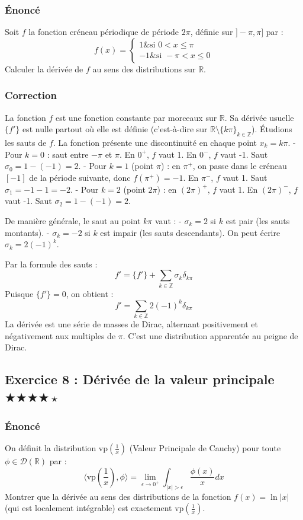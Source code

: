 \documentclass[11pt,a4paper]{article}
\begin{document}
\subsubsection*{Énoncé}
Soit $f$ la fonction créneau périodique de période $2\pi$, définie sur $]-\pi, \pi]$ par :
$$
f(x) = \begin{cases}
1 \& \text{si } 0 < x \le \pi \\
-1 \& \text{si } -\pi < x \le 0
\end{cases}
$$
Calculer la dérivée de $f$ au sens des distributions sur $\mathbb{R}$.

\subsubsection*{Correction}
La fonction $f$ est une fonction constante par morceaux sur $\mathbb{R}$.
Sa dérivée usuelle $\{f'\}$ est nulle partout où elle est définie (c'est-à-dire sur $\mathbb{R} \setminus \{k\pi\}_{k \in \mathbb{Z}}$).
Étudions les sauts de $f$. La fonction présente une discontinuité en chaque point $x_k = k\pi$.
- Pour $k = 0$ : saut entre $-\pi$ et $\pi$. En $0^+$, $f$ vaut 1. En $0^-$, $f$ vaut -1. Saut $\sigma_0 = 1 - (-1) = 2$.
- Pour $k = 1$ (point $\pi$) : en $\pi^+$, on passe dans le créneau $[-1]$ de la période suivante, donc $f(\pi^+) = -1$. En $\pi^-$, $f$ vaut 1. Saut $\sigma_1 = -1 - 1 = -2$.
- Pour $k = 2$ (point $2\pi$) : en $(2\pi)^+$, $f$ vaut 1. En $(2\pi)^-$, $f$ vaut -1. Saut $\sigma_2 = 1 - (-1) = 2$.

De manière générale, le saut au point $k\pi$ vaut :
- $\sigma_k = 2$ si $k$ est pair (les sauts montants).
- $\sigma_k = -2$ si $k$ est impair (les sauts descendants).
On peut écrire $\sigma_k = 2(-1)^k$.

Par la formule des sauts :
$$ f' = \{f'\} + \sum_{k \in \mathbb{Z}} \sigma_k \delta_{k\pi} $$
Puisque $\{f'\} = 0$, on obtient :
$$ f' = \sum_{k \in \mathbb{Z}} 2(-1)^k \delta_{k\pi} $$
La dérivée est une série de masses de Dirac, alternant positivement et négativement aux multiples de $\pi$. C'est une distribution apparentée au peigne de Dirac.


\subsection*{Exercice 8 : Dérivée de la valeur principale  \quad$\bigstar\bigstar\bigstar\bigstar\star$}


\subsubsection*{Énoncé}
On définit la distribution $\text{vp}\left(\frac{1}{x}\right)$ (Valeur Principale de Cauchy) pour toute $\phi \in \mathcal{D}(\mathbb{R})$ par :
$$ \langle \text{vp}\left(\frac{1}{x}\right), \phi \rangle = \lim_{\epsilon \to 0^+} \int_{|x|>\epsilon} \frac{\phi(x)}{x} dx $$
Montrer que la dérivée au sens des distributions de la fonction $f(x) = \ln|x|$ (qui est localement intégrable) est exactement $\text{vp}\left(\frac{1}{x}\right)$.
\end{document}
